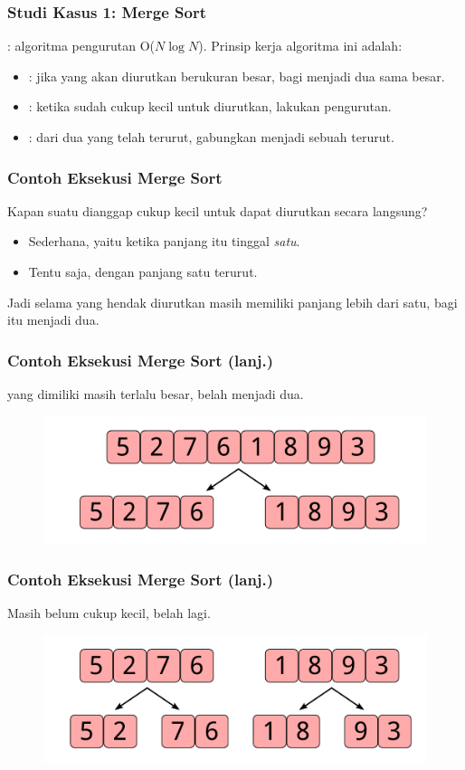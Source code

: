 \begin{frame}
\frametitle{Studi Kasus 1: Merge Sort}
\fMergeSort: algoritma pengurutan O($N \log{N}$).
\newline
\newline
Prinsip kerja algoritma ini adalah:
\begin{itemize}
  \item {}: jika \farray yang akan diurutkan berukuran besar, bagi menjadi dua \farray sama besar.
  \item {}: ketika \farray sudah cukup kecil untuk diurutkan, lakukan pengurutan.
  \item {}: dari dua \farray yang telah terurut, gabungkan menjadi sebuah \farray terurut.
\end{itemize}
\end{frame}

\begin{frame}
\frametitle{Contoh Eksekusi Merge Sort}
Kapan suatu \farray dianggap cukup kecil untuk dapat diurutkan secara langsung?
\newline
\begin{itemize}
  \item Sederhana, yaitu ketika panjang \farray itu tinggal \emph{satu}.
  \item Tentu saja, \farray dengan panjang satu  terurut.
  \newline
\end{itemize}
Jadi selama \farray yang hendak diurutkan masih memiliki panjang lebih dari satu, bagi \farray itu menjadi dua.
\end{frame}

\begin{frame}
\frametitle{Contoh Eksekusi Merge Sort (lanj.)}
\fArray yang dimiliki masih terlalu besar, belah menjadi dua.
\begin{figure}
  \centering
  \includegraphics[width=10 cm]{asset/merge-sort-demo-1.pdf}
\end{figure}
\end{frame}

\begin{frame}
\frametitle{Contoh Eksekusi Merge Sort (lanj.)}
Masih belum cukup kecil, belah lagi.
\begin{figure}
  \centering
  \includegraphics[width=10 cm]{asset/merge-sort-demo-2.pdf}
\end{figure}
\end{frame}

